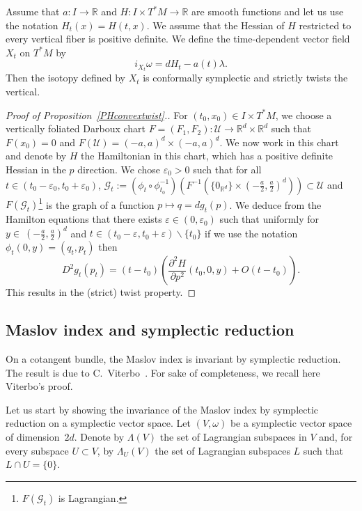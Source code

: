\documentclass[AHL, Unicode, longabstracts, published]{cedram}
\newcommand*\cg{\mathcal{G}}
\newcommand*\cU{\mathcal{U}}
\newcommand*\cal{\mathcal}
\newcommand*\R{\mathbb{R}}
\begin{document}
\begin{prop}\label{PHconvextwist}
Assume that $a:I\rightarrow \R$ and $H:I\times T^*M\rightarrow \R$ are smooth functions and let us use the notation $H_t(x)=H(t, x)$. We assume that the Hessian of $H$ restricted to every vertical fiber is positive definite. We define the time-dependent vector field $X_t$ on $T^*M$ by
\[
i_{X_t}\omega=dH_t-a(t)\lambda.
\]
Then the isotopy defined by $X_t$ is conformally symplectic and strictly twists the vertical.
\end{prop}

\begin{proof}[Proof of Proposition~\ref{PHconvextwist}.] For $(t_0, x_0)\in I\times T^*M$, we choose a vertically foliated Darboux chart $F=(F_1, F_2):\cU \rightarrow \R^d\times \R^d$ such that $F(x_0)=0$ and $F(\cal U)=(-a, a)^{d}\times (-a, a)^d$.\newline
We now work in this chart and denote by $H$ the Hamiltonian in this chart, which has a positive definite Hessian in the $p$ direction. We chose $\varepsilon_0 >0$ such that for all $t\in (t_0-\varepsilon_0, t_0+\varepsilon_0)$, ${\cg}_t:=(\phi_t\circ\phi_{t_0}^{-1})(F^{-1}(\{ 0_{\R^d}\}\times (-\frac{a}{2}, \frac{a}{2})^d)) \subset\cU$ and $F({\cg_t})$\footnote{$F({\cg_t})$ is Lagrangian.} is the graph of a function $p\mapsto q=dg_t(p)$. We deduce from the Hamilton equations that there exists $\varepsilon\in (0, \varepsilon_0)$ such that uniformly for $y\in \ (-\frac{a}{2}, \frac{a}{2})^d$ and $t\in (t_0-\varepsilon, t_0+\varepsilon)\backslash \{t_0\}$ if we use the notation $\phi_t(0, y)=(q_t, p_t)$ then
\[
D^2g_t(p_t)= (t-t_0)\left(\frac{\partial^2 H}{\partial p^2}(t_0, 0, y)+O(t-t_0)\right).
\]
This results in the {(strict) }twist property.
\end{proof}

\subsection{Maslov index and symplectic reduction}\label{sym reduction}
On a cotangent bundle, the Maslov index is invariant by symplectic reduction. The result is due to C.~Viterbo~\cite{Vit1987}. For sake of completeness, we recall here Viterbo's proof.


Let us start by showing the invariance of the Maslov index by symplectic reduction on a symplectic vector space. Let $(V,\omega)$ be a symplectic vector space of dimension~$2d$. Denote by $\Lambda(V)$ the set of Lagrangian subspaces in $V$ and, for every subspace $U\subset V$, by $\Lambda_U(V)$ the set of Lagrangian subspaces $L$ such that $L\cap U=\{0\}$.
\end{document}
